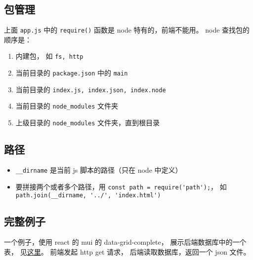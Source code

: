 \subsection{包管理}

上面 \verb`app.js` 中的 \verb`require()` 函数是 node 特有的，前端不能用。
node 查找包的顺序是：
\begin{enumerate}
\item 内建包， 如 \verb`fs, http`
\item 当前目录的 \verb`package.json` 中的 \verb`main`
\item 当前目录的 \verb`index.js, index.json, index.node`
\item 当前目录的 \verb`node_modules` 文件夹
\item 上级目录的 \verb`node_modules` 文件夹，直到根目录
\end{enumerate}

\subsection{路径}
\begin{itemize}
\item \verb`__dirname` 是当前 js 脚本的路径（只在 node 中定义）
\item 要拼接两个或者多个路径，用 \verb`const path = require('path');`， 如 \verb`path.join(__dirname, '../', 'index.html')`
\end{itemize}

\subsection{完整例子}
一个例子，使用 react 的 mui 的 data-grid-complete， 展示后端数据库中的一个表， 见\href{https://chatgpt.com/share/0c404191-f992-4422-9527-56edc75b7415}{这里}。 前端发起 http get 请求， 后端读取数据库，返回一个 json 文件。
